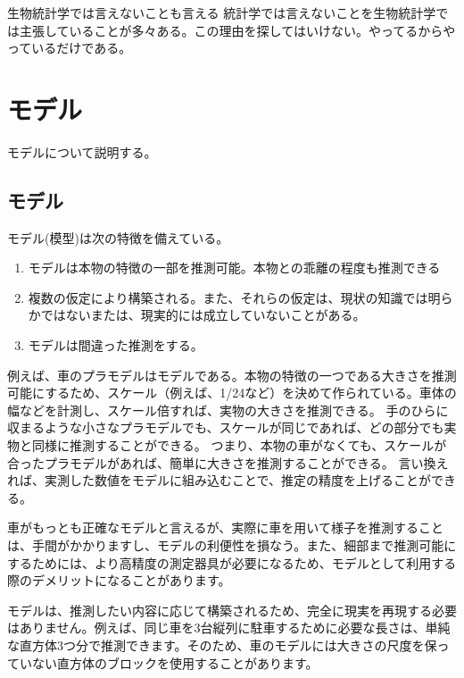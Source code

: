 \begin{SMbox}{生物統計学では言えないことも言える}
    統計学では言えないことを生物統計学では主張していることが多々ある。この理由を探してはいけない。やってるからやっているだけである。

\end{SMbox}

\chapter{モデル}
モデルについて説明する。

\section{モデル}
モデル(模型)は次の特徴を備えている。
\begin{enumerate}
    \item モデルは本物の特徴の一部を推測可能。本物との乖離の程度も推測できる
    \item 複数の仮定により構築される。また、それらの仮定は、現状の知識では明らかではないまたは、現実的には成立していないことがある。
    \item モデルは間違った推測をする。
\end{enumerate}
  
例えば、車のプラモデルはモデルである。本物の特徴の一つである大きさを推測可能にするため、スケール（例えば、1/24など）を決めて作られている。車体の幅などを計測し、スケール倍すれば、実物の大きさを推測できる。
手のひらに収まるような小さなプラモデルでも、スケールが同じであれば、どの部分でも実物と同様に推測することができる。
つまり、本物の車がなくても、スケールが合ったプラモデルがあれば、簡単に大きさを推測することができる。
言い換えれば、実測した数値をモデルに組み込むことで、推定の精度を上げることができる。

車がもっとも正確なモデルと言えるが、実際に車を用いて様子を推測することは、手間がかかりますし、モデルの利便性を損なう。また、細部まで推測可能にするためには、より高精度の測定器具が必要になるため、モデルとして利用する際のデメリットになることがあります。

モデルは、推測したい内容に応じて構築されるため、完全に現実を再現する必要はありません。例えば、同じ車を3台縦列に駐車するために必要な長さは、単純な直方体3つ分で推測できます。そのため、車のモデルには大きさの尺度を保っていない直方体のブロックを使用することがあります。

